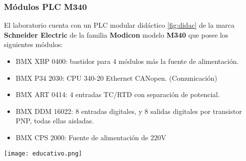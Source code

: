 \subsubsection{Módulos PLC M340}
El laboratorio cuenta con un PLC modular didáctico \ref{fig:didac} de la marca \textbf{Schneider Electric} de la familia \textbf{Modicon} modelo \textbf{M340} que posee los siguientes módulos:
\begin{itemize}
	\item BMX XBP 0400: bastidor para 4 módulos más la fuente de alimentación.
	\item BMX P34 2030: CPU 340-20 Ethernet CANopen.   (Comunicación)
	\item BMX ART 0414: 4 entradas TC/RTD con separación de potencial.
	\item BMX DDM 16022: 8 entradas digitales, y 8 salidas digitales por transistor PNP, todas ellas aisladas.
	\item BMX CPS 2000: Fuente de alimentación de 220V
\end{itemize}
\begin{center}
	\texttt{[image: educativo.png]}
	\label{fig:didac}
\end{center}




